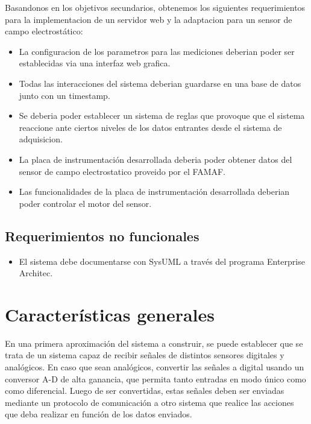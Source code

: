 Basandonos en los objetivos secundarios, obtenemos los siguientes requerimientos para la implementacion de un servidor web y la adaptacion para un sensor de campo electrostático:

\begin{itemize}
    \item La configuracion de los parametros para las mediciones deberian poder ser establecidas via una interfaz web grafica.
    \item Todas las interacciones del sistema deberian guardarse en una base de datos junto con un timestamp.
    \item Se deberia poder establecer un sistema de reglas que provoque que el sistema reaccione ante ciertos niveles de los datos entrantes desde el sistema de adquisicion.
    \item La placa de instrumentación desarrollada deberia poder obtener datos del sensor de campo electrostatico proveido por el FAMAF.
    \item Las funcionalidades de la placa de instrumentación desarrollada deberian poder controlar el motor del sensor.
\end{itemize}


\subsection{Requerimientos no funcionales} %
\label{sub:requerimientos_no_funcionales}

\begin{itemize}
	\item El sistema debe documentarse con SysUML a través del programa Enterprise Architec.
\end{itemize}



\section{Características generales} %
\label{sec:caracteristicas_generales}

En una primera aproximación del sistema a construir, se puede establecer que se trata de un sistema capaz de recibir señales de distintos sensores digitales y analógicos. En caso que sean analógicos, convertir las señales a digital usando un conversor A-D de alta ganancia, que permita tanto entradas en modo único como como diferencial. Luego de ser convertidas, estas señales deben ser enviadas mediante un protocolo de comunicación a otro sistema que realice las acciones que deba realizar en función de los datos enviados.

